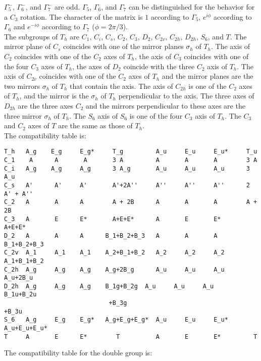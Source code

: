 \documentclass[12pt,a4paper]{article}
\begin{document}
$\Gamma_5^-$, $\Gamma_6^-$, and $\Gamma_7^-$ are odd. $\Gamma_5$,
$\Gamma_6$, and $\Gamma_7$ can be distinguished for the behavior for a $C_3$ 
rotation. The character of the matrix is $1$ according to 
$\Gamma_5$, $e^{i\phi}$ according to $\Gamma_6$ and $e^{-i\phi}$ according 
to $\Gamma_7$ ($\phi=2\pi/3$). \\
The subgroups of $T_h$ are $C_1$, $C_i$, $C_s$, $C_2$, $C_3$, $D_2$, $C_{2v}$,
$C_{2h}$, $D_{2h}$, $S_6$, and $T$. The mirror plane of $C_s$ coincides
with one of the mirror planes $\sigma_h$ of $T_h$. The axis of $C_2$ coincides 
with one of the $C_2$ axes of $T_h$, the axis of $C_3$ coincides with one of the four
$C_3$ axes of $T_h$, the axes of $D_2$ coincide with the three $C_2$ axis
of $T_h$. The axis of $C_{2v}$ coincides with one of the $C_2$ axes of 
$T_h$ and the mirror planes are the two mirrors $\sigma_h$ of $T_h$ that
contain the axis. The axis of $C_{2h}$ is one of the $C_2$ axes of $T_h$,
and the mirror is the $\sigma_h$ of $T_h$ perpendicular to the
axis. The three axes of $D_{2h}$ are the three axes $C_2$ and the mirrors
perpendicular to these axes are the three mirror $\sigma_h$ of $T_h$.
The $S_6$ axis of $S_6$ is one of the four $C_3$ axis of $T_h$.
The $C_3$ and $C_2$ axes of $T$ are the same as those of $T_h$. \\
The compatibility table is:
\begin{footnotesize}
\begin{verbatim}
T_h   A_g    E_g     E_g*     T_g         A_u     E_u     E_u*     T_u
C_1    A      A       A       3 A         A       A       A        3 A
C_i   A_g    A_g     A_g      3 A_g       A_u     A_u     A_u      3 A_u
C_s   A'      A'     A'       A'+2A''     A''     A''     A''      2 A' + A''
C_2   A       A      A        A + 2B      A       A       A        A + 2B
C_3   A       E      E*       A+E+E*      A       E       E*       A+E+E*
D_2   A       A      A      B_1+B_2+B_3   A       A       A        B_1+B_2+B_3
C_2v  A_1     A_1    A_1    A_2+B_1+B_2   A_2     A_2     A_2      A_1+B_1+B_2
C_2h  A_g     A_g    A_g    A_g+2B_g      A_u     A_u     A_u      A_u+2B_u
D_2h  A_g     A_g    A_g    B_1g+B_2g  A_u     A_u     A_u         B_1u+B_2u
                             +B_3g                                   +B_3u
S_6   A_g     E_g    E_g*   A_g+E_g+E_g*  A_u     E_u     E_u*   A_u+E_u+E_u*
T     A       E      E*        T          A       E       E*         T
\end{verbatim}
\end{footnotesize}
The compatibility table for the double group is:
\end{document}
